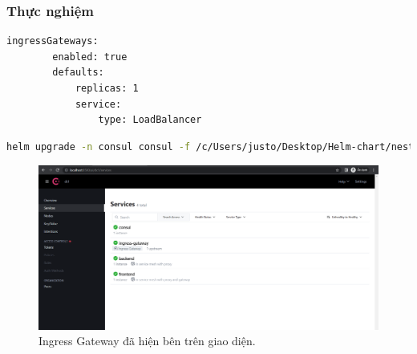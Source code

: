 \documentclass[14pt,a4paper]{report}
\begin{document}
{	\subsubsection{Thực nghiệm}
	\hspace{1.0cm}{Đầu tiên, để tạo ra ingress gateway, thì chúng ta cần cập nhật tệp tin values.yaml ở phần các bước triển khai. Chúng ta sẽ thêm vào một phần sau vào bên dưới tệp:}
	\begin{lstlisting}[language=Bash]
	ingressGateways:
		enabled: true
		defaults:
			replicas: 1	
			service:
				type: LoadBalancer
	\end{lstlisting}
	\hspace{1.0cm}{Sau khi thêm vào, chúng ta sẽ chạy câu lệnh sau để update chart của Consul}
	\begin{lstlisting}[language=Bash]
	helm upgrade -n consul consul -f /c/Users/justo/Desktop/Helm-chart/nestjs-helm/consul/helm/values.yaml hashicorp/consul
	\end{lstlisting}
	\hspace{1.0cm}{Sau khi helm upgrade xong chart, thì chúng ta sẽ truy cập vào giao diện của Consul và xem kết quả:}
	\pagebreak
	\begin{figure}[h]
	\centering
	\includegraphics[width=1\linewidth]{Pics/localhost-8500}
	\caption{\label{fig:localhost-8500} Ingress Gateway đã hiện bên trên giao diện.}
	\label{fig:localhost-8500}
	\end{figure}

}
\end{document}
